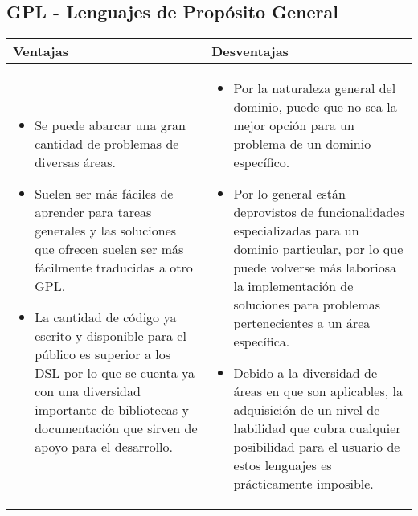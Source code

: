 \documentclass[12pt]{article}
\begin{document}
\begin{center}
  \subsection*{GPL - Lenguajes de Propósito General}
  \begin{tabularx}{\textwidth}{X|X}
    \textbf{Ventajas} & \textbf{Desventajas} \\
    \hline
    \begin{itemize}
    \item Se puede abarcar una gran cantidad de problemas de diversas áreas.
    \item Suelen ser más fáciles de aprender para tareas generales y las soluciones que ofrecen suelen ser más fácilmente traducidas a otro GPL.
    \item La cantidad de código ya escrito y disponible para el público es superior a los DSL por lo que se cuenta ya con una diversidad importante de bibliotecas y documentación que sirven de apoyo para el desarrollo. 
    \end{itemize}
    &
    \begin{itemize}
    \item Por la naturaleza general del dominio, puede que no sea la mejor opción para un problema de un dominio específico.
    \item Por lo general están deprovistos de funcionalidades especializadas para un dominio particular, por lo que puede volverse más laboriosa la implementación de soluciones para problemas pertenecientes a un área específica. 
    \item Debido a la diversidad de áreas en que son aplicables, la adquisición de un nivel de habilidad que cubra cualquier posibilidad para el
      usuario de estos lenguajes es prácticamente imposible.
    \end{itemize}\\
  \end{tabularx}
\end{center}
\end{document}
